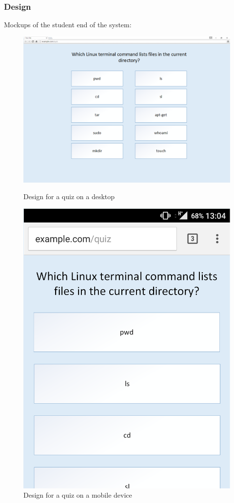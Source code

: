 \subsubsection{Design}
Mockups of the student end of the system: 
\begin{center}
	\begin{figure}
		\caption{Design for a quiz on a desktop}
		\includegraphics[width=\textwidth]{Chapter2/Iter-4/Quiz-Web-Design-Cropped}\\
		\label{fig:quiz-desktop}
	\end{figure}
	\vspace{1cm}
	\begin{figure}
		\caption{Design for a quiz on a mobile device}
		\includegraphics[scale=0.25]{Chapter2/Iter-4/Quiz-Mobile-Cropped}

\end{figure}
\end{center}
